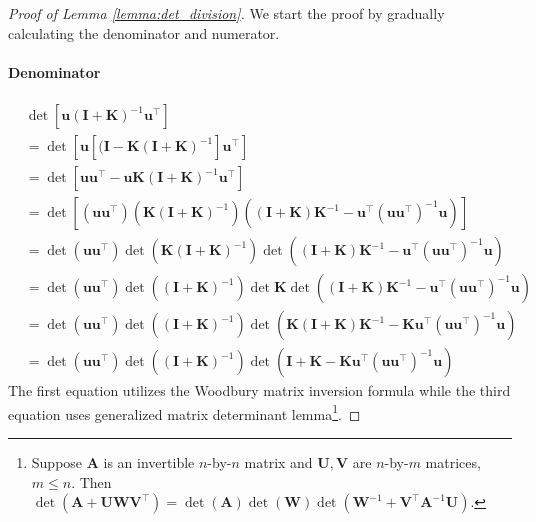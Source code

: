 \begin{proof}[Proof of Lemma \ref{lemma:det_division}]
We start the proof by gradually calculating the denominator and numerator.
\paragraph{Denominator}

\begin{align}
&\det[\mathbf{u} (\mathbf{I} + \mathbf{K})^{-1} \mathbf{u}^\top] \nonumber
\\ 
&= \det [\mathbf{u} \left[ (\mathbf{I} - \mathbf{K}(\mathbf{I}+\mathbf{K})^{-1}\right]\mathbf{u}^\top] \nonumber
\\
&=\det [\mathbf{u} \mathbf{u}^\top - \mathbf{u} \mathbf{K}(\mathbf{I}+\mathbf{K})^{-1} \mathbf{u}^\top]  \nonumber
\\
&= \det \left[  (\mathbf{u} \mathbf{u}^\top) \left(\mathbf{K}(\mathbf{I}+\mathbf{K})^{-1}\right) \left( (\mathbf{I} + \mathbf{K}) \mathbf{K}^{-1} - \mathbf{u}^\top (\mathbf{u} \mathbf{u}^\top)^{-1} \mathbf{u}\right) \right] \nonumber
\\
&= \det (\mathbf{u} \mathbf{u}^\top) \det \left(\mathbf{K}(\mathbf{I}+\mathbf{K})^{-1}\right) \det \left( (\mathbf{I} + \mathbf{K}) \mathbf{K}^{-1} - \mathbf{u}^\top (\mathbf{u} \mathbf{u}^\top)^{-1} \mathbf{u}\right) \nonumber 
\\
&= \det (\mathbf{u} \mathbf{u}^\top) \det \left((\mathbf{I}+\mathbf{K})^{-1}\right) \det \mathbf{K} \det \left( (\mathbf{I} + \mathbf{K}) \mathbf{K}^{-1} - \mathbf{u}^\top (\mathbf{u} \mathbf{u}^\top)^{-1} \mathbf{u}\right) \nonumber 
\\
& = \det (\mathbf{u} \mathbf{u}^\top) \det \left((\mathbf{I}+\mathbf{K})^{-1}\right) \det \left( \mathbf{K}(\mathbf{I} + \mathbf{K}) \mathbf{K}^{-1} - \mathbf{K}\mathbf{u}^\top (\mathbf{u} \mathbf{u}^\top)^{-1} \mathbf{u}\right)  \label{Eqn:u_K_inv_uT}
\\
& = \det (\mathbf{u} \mathbf{u}^\top) \det \left((\mathbf{I}+\mathbf{K})^{-1}\right) \det \left(\mathbf{I} + \mathbf{K} - \mathbf{K}\mathbf{u}^\top (\mathbf{u} \mathbf{u}^\top)^{-1} \mathbf{u}\right) \nonumber
\end{align}
The first equation utilizes the Woodbury matrix inversion formula while the third equation uses generalized matrix determinant lemma\footnote{Suppose $\mathbf{A}$ is an invertible $n$-by-$n$ matrix and $\mathbf{U}, \mathbf{V}$ are $n$-by-$m$ matrices, $m \le n$. Then $\det(\mathbf{A} + \mathbf{U}\mathbf{W}\mathbf{V}^\top) = \det(\mathbf{A}) \det(\mathbf{W})\det(\mathbf{W}^{-1} + \mathbf{V}^\top \mathbf{A}^{-1} \mathbf{U})$.}.

\end{proof}
